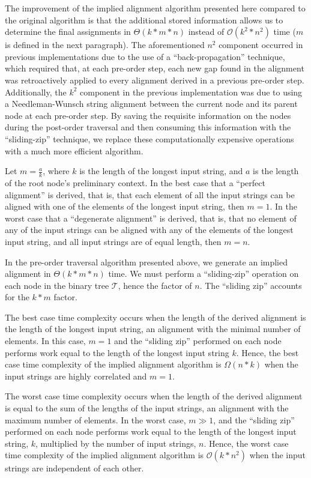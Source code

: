 \documentclass{bmcart}
\begin{document}
The improvement of the implied alignment algorithm presented here compared to the original algorithm is that the additional stored information allows us to determine the final assignments in $\Theta(k * m * n)$ instead of $\mathcal{O}(k^2 * n^2)$ time ($m$ is defined in the next paragraph). 
The aforementioned $n^2$ component occurred in previous implementations due to the use of a ``back-propagation'' technique, which required that, at each pre-order step, each new gap found in the alignment was retroactively applied to every alignment derived in a previous pre-order step.
Additionally, the $k^2$ component in the previous implementation was due to using a Needleman-Wunsch string alignment between the current node and its parent node at each pre-order step.
By saving the requisite information on the nodes during the post-order traversal and then consuming this information with the ``sliding-zip'' technique, we replace these computationally expensive operations with a much more efficient algorithm.

Let $m = \frac{a}{k}$, where $k$ is the length of the longest input string, and $a$ is the length of the root node's preliminary context.
In the best case that a ``perfect alignment'' is derived, that is, that each element of all the input strings can be aligned with one of the elements of the longest input string, then $m = 1$.
In the worst case that a ``degenerate alignment'' is derived, that is, that no element of any of the input strings can be aligned with any of the elements of the longest input string, and all input strings are of equal length, then $m = n$.

In the pre-order traversal algorithm presented above, we generate an implied alignment in $\Theta(k * m * n)$ time.
We must perform a ``sliding-zip'' operation on each node in the binary tree $\mathcal{T}$, hence the factor of $n$.
The ``sliding zip'' accounts for the $k * m$ factor.

The best case time complexity occurs when the length of the derived alignment is the length of the longest input string, an alignment with the minimal number of elements.
In this case, $m = 1$ and the ``sliding zip'' performed on each node performs work equal to the length of the longest input string $k$.
Hence, the best case time complexity of the implied alignment algorithm is $\Omega(n*k)$ when the input strings are highly correlated and $m = 1$.

The worst case time complexity occurs when the length of the derived alignment is equal to the sum of the lengths of the input strings, an alignment with the maximum number of elements.
In the worst case, $m \gg 1$, and the ``sliding zip'' performed on each node performs work equal to the length of the longest input string, $k$, multiplied by the number of input strings, $n$.
Hence, the worst case time complexity of the implied alignment algorithm is $\mathcal{O}(k * n^2)$ when the input strings are independent of each other.
\end{document}
